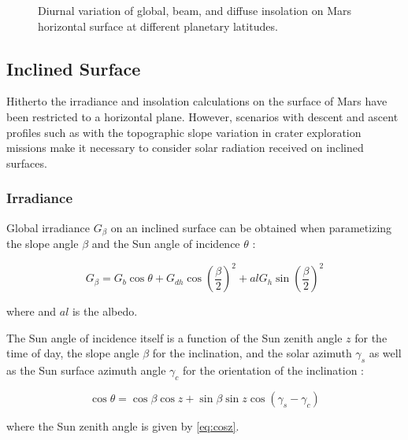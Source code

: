 \begin{figure}[H]
\begin{subfigure}[t]{\subfigureWidth}
  		\label{fig:sub:insolation-phi-p20}
	   \end{subfigure}\hfill
	\caption{Diurnal variation of global, beam, and diffuse insolation on Mars horizontal surface at different planetary latitudes.}
	\label{fig:plot:insolation-phi}
\vspace{-2ex}
\end{figure}

\subsection{Inclined Surface}
\label{sec:MartianEnvironment:SolarRadiation:InclinedSurface}

Hitherto the irradiance and insolation calculations on the surface of Mars have been restricted to a horizontal plane. However, scenarios with descent and ascent profiles such as with the topographic slope variation in crater exploration missions make it necessary to consider solar radiation received on inclined surfaces.

\subsubsection{Irradiance}
\label{sec:MartianEnvironment:SolarRadiation:InclinedSurface:Irradiance}

Global irradiance $G_{\beta}$ on an inclined surface can be obtained when parametizing the slope angle $\beta$ and the Sun angle of incidence $\theta$ :

\begin{equation}
  \label{eq:G_beta}
  G_{\beta} = G_{b}\cos{\theta} + G_{dh}\cos{(\frac{\beta}{2})}^2 + al G_{h} \sin{(\frac{\beta}{2})}^2
\end{equation}

where and $al$ is the albedo.

The Sun angle of incidence itself is a function of the Sun zenith angle $z$ for the time of day, the slope angle $\beta$ for the inclination, and the solar azimuth $\gamma_{s}$ as well as the Sun surface azimuth angle $\gamma_{c}$ for the orientation of the inclination :

\begin{equation}
  \label{eq:costheta}
  \cos{\theta} = \cos{\beta}\cos{z} +  \sin{\beta}\sin{z}\cos{(\gamma_{s} - \gamma_{c})}
\end{equation}

where the Sun zenith angle is given by \ref{eq:cosz}.

